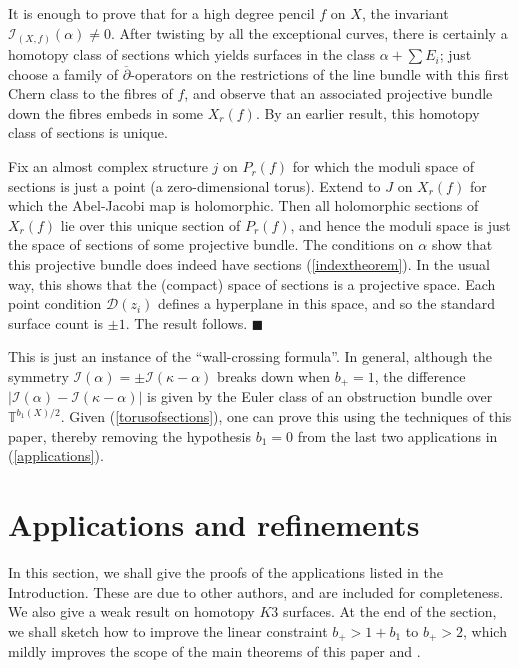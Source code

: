 \documentclass[10pt]{article}
\newcommand{\rot}{\mathbb{T}}
\newcommand{\cdbar}{\overline{\partial}}
\newenvironment{Pf}{\par \noindent{\sc Proof:} }{\quad $\blacksquare$ \par
\vspace{0.5cm}}
\begin{document}
\begin{Pf}
It is enough to prove that for a high degree pencil $f$ on $X$, the
invariant $\mathcal{I}_{(X,f)}(\alpha) \neq 0$.  After twisting by all
the exceptional curves, there is certainly a homotopy class of
sections which yields surfaces in the class $\alpha + \sum E_i$; just
choose a family of $\cdbar$-operators on the restrictions of the line
bundle with this first Chern class to the fibres of $f$, and observe
that an associated projective bundle down the fibres embeds in some $X_r(f)$.
By an earlier result, this homotopy class of sections is unique.

\vspace{0.2cm}

\noindent Fix an almost complex structure $j$ on $P_r(f)$ for which the moduli
space of sections is just a point (a zero-dimensional torus).  Extend
to $J$ on $X_r(f)$ for which the Abel-Jacobi map is holomorphic.  Then
all holomorphic sections of $X_r(f)$ lie over this unique section of
$P_r(f)$, and hence the moduli space is just the space of sections of
some projective bundle.  The conditions on $\alpha$ show that this
projective bundle does indeed have sections (\ref{indextheorem}).  In
the usual way,  this shows that the (compact) space
of sections is a projective space.  Each point condition
$\mathcal{D}(z_i)$ defines a hyperplane in this space, and so the
standard surface count is $\pm 1$.  The result follows.
\end{Pf}

\noindent This is just an instance of the ``wall-crossing formula''.
In general, although the symmetry $\mathcal{I}(\alpha) = \pm
\mathcal{I}(\kappa-\alpha)$ breaks down when $b_+ = 1$, the difference
$|\mathcal{I}(\alpha) - \mathcal{I}(\kappa-\alpha)|$ is given by the
Euler class of an obstruction bundle over $\rot^{b_1(X)/2}$.  Given
(\ref{torusofsections}), one can
prove this using the techniques of this paper, thereby removing the
hypothesis $b_1 = 0$ from the last two applications in (\ref{applications}).




\section{Applications and refinements}

In this section, we shall give the proofs of the applications listed
in the Introduction.  These are due to other authors, and are included
for completeness.  We also give a weak result on homotopy $K3$
surfaces.  At the end of the section, we shall sketch how to
improve the linear constraint $b_+ > 1+b_1$ to $b_+ > 2$, which mildly
improves the scope of the main theorems of this paper and
\cite{SKDIS}.
\end{document}
